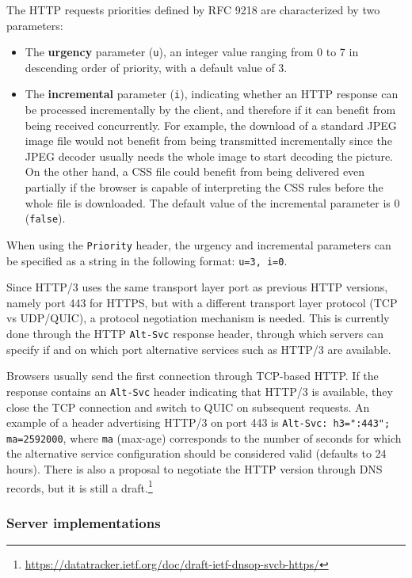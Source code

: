 The HTTP requests priorities defined by RFC 9218 are characterized by two parameters:

\begin{itemize}
    \item The \textbf{urgency} parameter (\texttt{u}), an integer value ranging from 0 to 7 in descending order of priority, with a default value of 3.
    \item The \textbf{incremental} parameter (\texttt{i}), indicating whether an HTTP response can be processed incrementally by the client, and therefore if it can benefit from being received concurrently. For example, the download of a standard JPEG image file would not benefit from being transmitted incrementally since the JPEG decoder usually needs the whole image to start decoding the picture. On the other hand, a CSS file could benefit from being delivered even partially if the browser is capable of interpreting the CSS rules before the whole file is downloaded. The default value of the incremental parameter is 0 (\texttt{false}).
\end{itemize}

When using the \texttt{Priority} header, the urgency and incremental parameters can be specified as a string in the following format: \texttt{u=3, i=0}.

Since HTTP/3 uses the same transport layer port as previous HTTP versions, namely port 443 for HTTPS, but with a different transport layer protocol (TCP vs UDP/QUIC), a protocol negotiation mechanism is needed. This is currently done through the HTTP \texttt{Alt-Svc} response header, through which servers can specify if and on which port alternative services such as HTTP/3 are available.

Browsers usually send the first connection through TCP-based HTTP. If the response contains an \texttt{Alt-Svc} header indicating that HTTP/3 is available, they close the TCP connection and switch to QUIC on subsequent requests. An example of a header advertising HTTP/3 on port 443 is \verb|Alt-Svc: h3=":443"; ma=2592000|, where \texttt{ma} (max-age) corresponds to the number of seconds for which the alternative service configuration should be considered valid (defaults to 24 hours). There is also a proposal to negotiate the HTTP version through DNS records, but it is still a draft.\footnote{\url{https://datatracker.ietf.org/doc/draft-ietf-dnsop-svcb-https/}}

\subsubsection{Server implementations}
\label{sec:bg/http3/servers}

